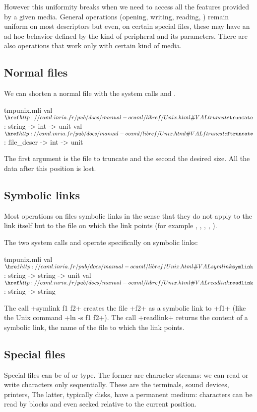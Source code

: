However this uniformity breaks when we need to access all the
features provided by a given media. General operations (opening,
writing, reading, \etc) remain uniform on most descriptors but even,
on certain special files, these may have an ad hoc behavior defined
by the kind of peripheral and its parameters. There are also
operations that work only with certain kind of media.

\subsection*{Normal files}

We can shorten a normal file with the system calls
 and .
%
\begin{listingcodefile}{tmpunix.mli}
val $\libvalue{Unix}{truncate}$  : string -> int -> unit
val $\libvalue{Unix}{ftruncate}$ : file_descr -> int -> unit
\end{listingcodefile}
%
The first argument is the file to truncate and the second the desired
size. All the data after this position is lost.

\subsection*{Symbolic links}

Most operations on files  symbolic links in the sense
that they do not apply to the link itself but to the file on which the
link points (for example ,
, , , \etc). 

The two system calls  and  operate
specifically on symbolic links:
%
\begin{listingcodefile}{tmpunix.mli}
val $\libvalue{Unix}{symlink}$  : string -> string -> unit
val $\libvalue{Unix}{readlink}$ : string -> string
\end{listingcodefile}
% 
The call \ml+symlink f1 f2+ creates the file \ml+f2+ as a symbolic
link to \ml+f1+ (like the Unix command \ml+ln -s f1 f2+). The call
\ml+readlink+ returns the content of a symbolic link, \ie{} the name of
the file to which the link points.

\subsection*{\label{sec/speciaux}Special files}

Special files can be of  or  type.
The former are character streams: we can read or write characters only
sequentially. These are the terminals, sound devices, printers, \etc{}
The latter, typically disks, have a permanent medium: characters can
be read by blocks and even seeked relative to the current position.

